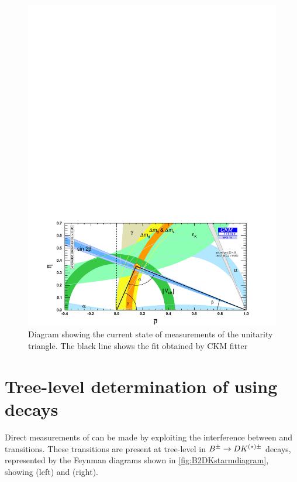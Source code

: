 \begin{figure}[!ht]
\centering
\includegraphics[trim = 0mm 0mm 0mm 180mm,clip,width=0.9\linewidth]{figures/theory/rhoeta_small_global.pdf}
\caption{Diagram showing the current state of measurements of the unitarity triangle. The black line shows the fit obtained by CKM fitter}
\label{globalfit}
\end{figure}

\section{Tree-level determination of \Pgamma using  decays}

Direct measurements of \Pgamma can be made by exploiting the interference between \decay{\bquark}{\cquark\uquarkbar\squark} and \decay{\bquark}{\uquark\cquarkbar\squark} transitions. These transitions are present at tree-level in ${{B}^\pm} \rightarrow {\ensuremath{D}}{\ensuremath{K}}^{(*)\pm}$ decays, represented by the Feynman diagrams shown in \fig\ref{fig:B2DKstarmdiagram}, showing \decay{\Bm}{\Dz\Kstarm} (left) and \decay{\Bm}{\Dzb\Kstarm} (right). 


